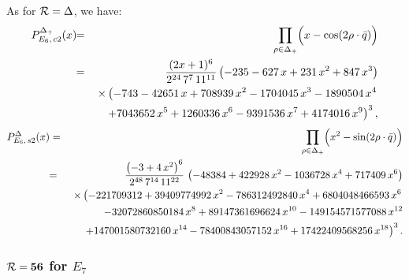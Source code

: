 \documentclass[a4paper,12pt]{article}
\begin{document}
As for ${\cal R}=\Delta$, we have:
\begin{eqnarray}
   P_{E_6,\,c2}^{{\Delta}_+}(x)&\!\!=\!\!&\prod_{\rho\in{\Delta}_+}
   \Bigl(x-\cos(2\rho\cdot\bar{q})\Bigr)\nonumber\\
%
   &\!\!=\!\!& {(2x+1)^6\over{2^{24}\,7^7\,11^{11}}}
   \left( -235 - 627\,x + 231\,x^2 + 847\,x^3 \right) \nonumber\\
   &&\times
   \left( -743 - 42651\,x + 708939\,x^2 - 1704045\,x^3 -
        1890504\,x^4\right.\nonumber\\
   &&\left.\quad\ + 7043652\,x^5 + 1260336\,x^6 -
        9391536\,x^7 + 4174016\,x^9 \right)^3,
\end{eqnarray}
\begin{eqnarray}
   P_{E_6,\,s2}^{{\Delta}}(x)&=&\prod_{\rho\in{\Delta}_+}
   \Bigl(x^2-\sin(2\rho\cdot\bar{q})\Bigr)\nonumber\\
%
   &\!\!=\!\!&
   {\left( -3 + 4\,x^2 \right)^6\over{2^{48}\,7^{14}\,11^{22}}}\,
    \left( -48384 + 422928\,x^2 - 1036728\,x^4 +
      717409\,x^6 \right)\\
   &&\times
   \left( -221709312 + 39409774992\,x^2 -
        786312492840\,x^4+ 6804048466593\,x^6 \right.\nonumber\\
   &&\quad\ -
        32072860850184\,x^8 + 89147361696624\,x^{10}-
        149154571577088\,x^{12} \nonumber\\
   &&\left.\quad\ + 147001580732160\,x^{14} -
        78400843057152\,x^{16} + 17422409568256\,x^{18} \right)^3.\nonumber
\end{eqnarray}

\subsubsection{${\cal R}={\bf 56}$ for $E_7$}
\end{document}
